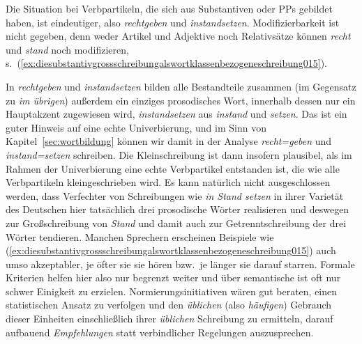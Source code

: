 Die Situation bei Verbpartikeln, die sich aus Substantiven oder PPs gebildet haben, ist eindeutiger, also \zB \textit{rechtgeben} und \textit{instandsetzen}.
Modifizierbarkeit ist nicht gegeben, denn weder Artikel und Adjektive noch Relativsätze können \textit{recht} und \textit{stand} noch modifizieren, s.\ (\ref{ex:diesubstantivgrossschreibungalswortklassenbezogeneschreibung015}).

\begin{exe}
  \ex\label{ex:diesubstantivgrossschreibungalswortklassenbezogeneschreibung015}
  \begin{xlist}
  \end{xlist}
\end{exe}

In \textit{rechtgeben} und \textit{instandsetzen} bilden alle Bestandteile zusammen (im Gegensatz zu \textit{im übrigen}) außerdem ein einziges prosodisches Wort, innerhalb dessen nur ein Hauptakzent zugewiesen wird, \zB \textit{in\Akz standsetzen} aus \textit{in\Akz stand} und \textit{\Akz setzen}.
Das ist ein guter Hinweis auf eine echte Univerbierung, und im Sinn von Kapitel~\ref{sec:wortbildung} können wir damit in der Analyse \textit{recht=geben} und \textit{instand=setzen} schreiben.
Die Kleinschreibung ist dann insofern plausibel, als im Rahmen der Univerbierung eine echte Verbpartikel entstanden ist, die wie alle Verbpartikeln kleingeschrieben wird.
Es kann natürlich nicht ausgeschlossen werden, dass Verfechter von Schreibungen wie \textit{in Stand setzen} in ihrer Varietät des Deutschen hier tatsächlich drei prosodische Wörter realisieren und deswegen zur Großschreibung von \textit{Stand} und damit auch zur Getrenntschreibung der drei Wörter tendieren.
Manchen Sprechern erscheinen Beispiele wie (\ref{ex:diesubstantivgrossschreibungalswortklassenbezogeneschreibung015}) auch umso akzeptabler, je öfter sie sie hören bzw.\ je länger sie darauf starren.
Formale Kriterien helfen hier also nur begrenzt weiter und über semantische ist oft nur schwer Einigkeit zu erzielen.
Normierungsinitiativen wären gut beraten, einen statistischen Ansatz zu verfolgen und den \textit{üblichen} (also \textit{häufigen}) Gebrauch dieser Einheiten einschließlich ihrer \textit{üblichen} Schreibung zu ermitteln, darauf aufbauend \textit{Empfehlungen} statt verbindlicher Regelungen auszusprechen.

